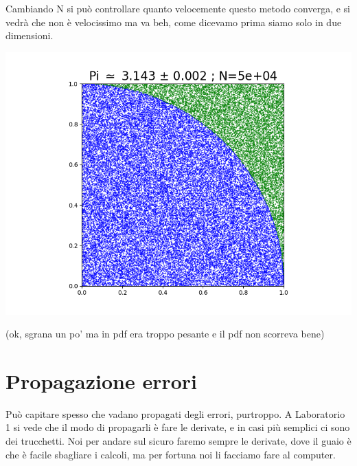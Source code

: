 \documentclass[10pt,a4paper]{article}
\begin{document}
Cambiando N si può controllare quanto velocemente questo metodo converga, e si vedrà che non è velocissimo ma va beh, come dicevamo prima siamo solo in due dimensioni.

\begin{center}
\includegraphics[scale=0.9]{img/mont_pi.png}
\end{center}
(ok, sgrana un po' ma in pdf era troppo pesante e il pdf non scorreva bene)

\newpage

\section{Propagazione errori}
Può capitare spesso che vadano propagati degli errori, purtroppo. A Laboratorio 1 si vede che il modo di propagarli è fare le derivate, e in casi più semplici ci sono dei trucchetti. Noi per andare sul sicuro faremo sempre le derivate, dove il guaio è che è facile sbagliare i calcoli, ma per fortuna noi li facciamo fare al computer.
\end{document}
